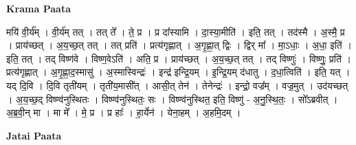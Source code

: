 \documentclass[17pt]{extarticle}
\begin{document}
\textbf{Krama Paata} \newline

मयि॑ वी॒र्य᳚म् । वी॒र्य॑म् तत् । तत् ते᳚ । ते॒ प्र । प्र दा᳚स्यामि । दा॒स्या॒मीति॑ । इति॒ तत् । तद॑स्मै । अ॒स्मै॒ प्र । प्राय॑च्छत् । अ॒य॒च्छ॒त् तत् । तत् प्रति॑ । प्रत्य॑गृह्णात् । अ॒गृ॒ह्णा॒त् द्विः । द्विर् मा᳚ । मा॒ऽधाः॒ । अ॒धा॒ इति॑ । इति॒ तत् । तद् विष्ण॑वे । विष्ण॒वेऽति॑ । अति॒ प्र । प्राय॑च्छत् । अ॒य॒च्छ॒त् तत् । तद् विष्णुः॑ । विष्णुः॒ प्रति॑ । प्रत्य॑गृह्णात् । अ॒गृ॒ह्णा॒द॒स्मासु॑ । अ॒स्मास्विन्द्रः॑ । इन्द्र॑ इन्द्रि॒यम् । इ॒न्द्रि॒यम् द॑धातु । द॒धा॒त्विति॑ । इति॒ यत् । यद् दि॒वि । दि॒वि तृती॑यम् । तृती॑य॒मासी᳚त् । आसी॒त् तेन॑ । तेनेन्द्रः॑ । इन्द्रो॒ वज्र᳚म् । वज्र॒मुत् । उद॑यच्छत् । अ॒य॒च्छ॒द् विष्ण्व॑नुस्थितः । विष्ण्व॑नुस्थितः॒ सः । विष्ण्व॑नुस्थित॒ इति॒ विष्णु॑ - अ॒नु॒स्थि॒तः॒ । सो᳚ऽब्रवीत् । अ॒ब्र॒वी॒न् मा । मा मे᳚ । मे॒ प्र । प्र हाः᳚ । हा॒र्येन॑ । येना॒हम् । अ॒हमि॒दम् । \newline

\textbf{Jatai Paata} \newline
\end{document}

